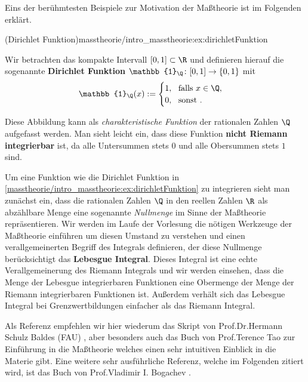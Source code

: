 \documentclass[letterpaper,10pt,german]{jupyterBook}
\begin{document}
\par
Eins der berühmtesten Beispiele zur Motivation der Maßtheorie ist im Folgenden erklärt.
\begin{example}{(Dirichlet Funktion)}{masstheorie/intro_masstheorie:ex:dirichletFunktion}



\par
Wir betrachten das kompakte Intervall \([0,1] \subset \R\) und definieren hierauf die sogenannte \textbf{Dirichlet Funktion} \(\mathbb{1}_\Q \colon [0,1] \rightarrow \{0,1\}\) mit
\begin{align*}
\mathbb{1}_\Q(x) := \begin{cases} 1, \ \text{ falls } x \in \Q, \\ 0, \ \text{ sonst }.\end{cases}
\end{align*}
\par
Diese Abbildung kann als \emph{charakteristische Funktion} der rationalen Zahlen \(\Q\) aufgefasst werden.
Man sieht leicht ein, dass diese Funktion \textbf{nicht Riemann integrierbar} ist, da alle Untersummen stets \(0\) und alle Obersummen stets \(1\) sind.
\end{example}

\par
Um eine Funktion wie die Dirichlet Funktion in \cref{masstheorie/intro_masstheorie:ex:dirichletFunktion} zu integrieren sieht man zunächst ein, dass die rationalen Zahlen \(\Q\) in den reellen Zahlen \(\R\) als abzählbare Menge eine sogenannte \emph{Nullmenge} im Sinne der Maßtheorie repräsentieren.
Wir werden im Laufe der Vorlesung die nötigen Werkzeuge der Maßtheorie einführen um diesen Umstand zu verstehen und einen verallgemeinerten Begriff des Integrals definieren, der diese Nullmenge berücksichtigt   das \textbf{Lebesgue Integral}.
Dieses Integral ist eine echte Verallgemeinerung des Riemann Integrals und wir werden einsehen, dass die Menge der Lebesgue integrierbaren Funktionen eine Obermenge der Menge der Riemann integrierbaren Funktionen ist.
Außerdem verhält sich das Lebesgue Integral bei Grenzwertbildungen einfacher als das Riemann Integral.

\par
Als Referenz empfehlen wir hier wiederum das Skript von Prof.Dr.Hermann Schulz Baldes (FAU) \cite{SB18}, aber besonders auch das Buch von Prof.Terence Tao zur Einführung in die Maßtheorie \cite{Tao07} welches einen sehr intuitiven Einblick in die Materie gibt. Eine weitere sehr ausführliche Referenz, welche im Folgenden zitiert wird, ist das Buch von Prof.Vladimir I. Bogachev \cite{Bog07}.
\end{document}

